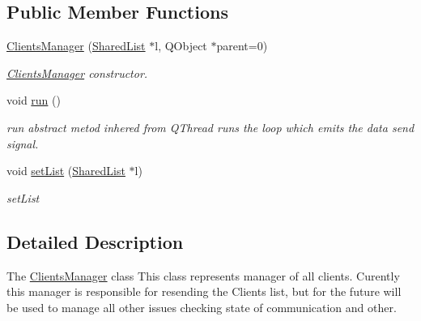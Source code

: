 \subsection*{Public Member Functions}
\begin{DoxyCompactItemize}
\item 
\hyperlink{classPenguinServer_1_1ClientsManager_a69c4459061b69d57b8df6b246afe5baa}{Clients\-Manager} (\hyperlink{classPenguinServer_1_1SharedList}{Shared\-List} $\ast$l, Q\-Object $\ast$parent=0)
\begin{DoxyCompactList}\small\item\em \hyperlink{classPenguinServer_1_1ClientsManager}{Clients\-Manager} constructor. \end{DoxyCompactList}\item 
\hypertarget{classPenguinServer_1_1ClientsManager_aae3e1462ada1fdac7b06dd4367f2ddd1}{void \hyperlink{classPenguinServer_1_1ClientsManager_aae3e1462ada1fdac7b06dd4367f2ddd1}{run} ()}\label{classPenguinServer_1_1ClientsManager_aae3e1462ada1fdac7b06dd4367f2ddd1}

\begin{DoxyCompactList}\small\item\em run abstract metod inhered from Q\-Thread runs the loop which emits the data send signal. \end{DoxyCompactList}\item 
void \hyperlink{classPenguinServer_1_1ClientsManager_ad2450664a05868d6581534a3994acfe2}{set\-List} (\hyperlink{classPenguinServer_1_1SharedList}{Shared\-List} $\ast$l)
\begin{DoxyCompactList}\small\item\em set\-List \end{DoxyCompactList}\end{DoxyCompactItemize}


\subsection{Detailed Description}
The \hyperlink{classPenguinServer_1_1ClientsManager}{Clients\-Manager} class This class represents manager of all clients. Curently this manager is responsible for resending the Clients list, but for the future will be used to manage all other issues checking state of communication and other. 

